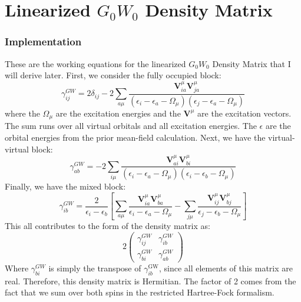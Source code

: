 \documentclass[12pt]{caltech_thesis}
\begin{document}
\chapter{Linearized $G_0W_0$ Density Matrix}
\subsection{Implementation}
These are the working equations for the linearized $G_0W_0$ Density Matrix that I will derive later. \autocite{bruneval_assessment_2019} First, we consider the fully occupied block:
\begin{equation}
\gamma_{i j}^{G W}=2\delta_{i j}-2\sum_{a \mu} \frac{\textbf{V}_{i a}^\mu \textbf{V}_{ja}^\mu}{\left(\epsilon_{i}-\epsilon_{a}-\Omega_{\mu}\right)\left(\epsilon_{j}-\epsilon_{a}-\Omega_{\mu}\right)}
\end{equation}
where the $\Omega_{\mu}$ are the excitation energies and the $\textbf{V}^{\mu}$ are the excitation vectors. The sum runs over all virtual orbitals and all excitation energies. The $\epsilon$ are the orbital energies from the prior mean-field calculation. Next, we have the virtual-virtual block:
\begin{equation}
\gamma_{a b}^{G W}=-2\sum_{i \mu } \frac{\textbf{V}_{a i}^{\mu} \textbf{V}_{b i}^{\mu}}{\left(\epsilon_{i}-\epsilon_{a}-\Omega_{\mu}\right)\left(\epsilon_{i}-\epsilon_{b}-\Omega_{\mu}\right)}
\end{equation}
Finally, we have the mixed block:
\begin{equation}
    \gamma_{i b}^{G W}=\frac{2}{\epsilon_{i}-\epsilon_{b}}\left[ \sum_{a \mu} \frac{\textbf{V}_{i a}^{\mu} \textbf{V}_{b a}^{\mu}}{\epsilon_{i}-\epsilon_{a}-\Omega_{\mu}} - \sum_{j \mu} \frac{\textbf{V}_{i j}^{\mu} \textbf{V}_{bj}^{\mu}}{\epsilon_{j}-\epsilon_{b}-\Omega_{\mu}} \right]
\end{equation}
This all contributes to the form of the density matrix as:
\begin{equation}
    2\begin{pmatrix}
        \gamma _{i j}^{G W} & \gamma _{i b}^{G W} \\
        \gamma _{bi}^{G W } & \gamma _{a b}^{G W}
    \end{pmatrix}
\end{equation}
Where $\gamma _{bi}^{G W }$ is simply the transpose of $\gamma _{ib}^{\text{GW}}$, since all elements of this matrix are real. Therefore, this density matrix is Hermitian. The factor of 2 comes from the fact that we sum over both spins in the restricted Hartree-Fock formalism.
\newpage
\end{document}
